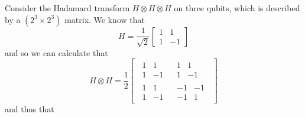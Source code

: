 \documentclass[fleqn]{article}
\begin{document}
Consider the Hadamard transform \(H\otimes H\otimes H\) on three qubits, which is described by a \((2^3\times2^3)\) matrix.
We know that
\[
  H = \frac{1}{\sqrt{2}}\begin{bmatrix}1&1\\1&-1\end{bmatrix}
\]
and so we can calculate that
\[
  H\otimes H
  = \frac{1}{2}
  \left[
  \,
    \begin{array}{c|c}
      \begin{matrix}1&1\\1&-1\end{matrix}
      & \begin{matrix}1&1\\1&-1\end{matrix}
    \\\hline
      \begin{matrix}1&1\\1&-1\end{matrix}
      & \begin{matrix}-1&-1\\-1&1\end{matrix}
    \end{array}
  \,
  \right]
\]
and thus that
\end{document}

